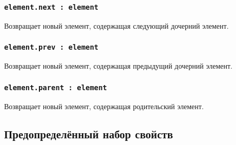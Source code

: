 \documentclass[a4paper, 14pt]{extarticle}
\begin{document}
\subsubsection{\lstinline|element.next : element|}

Возвращает новый элемент, содержащая следующий дочерний элемент.

\subsubsection{\lstinline|element.prev : element|}

Возвращает новый элемент, содержащая предыдущий дочерний элемент.

\subsubsection{\lstinline|element.parent : element|}

Возвращает новый элемент, содержащая родительский элемент.

\subsection{Предопределённый набор свойств}
\label{elements:predefined:properties}
\end{document}
